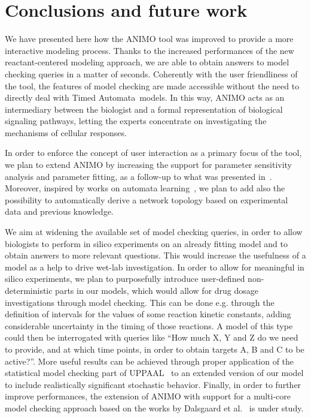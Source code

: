 \documentclass{llncs}
\newcommand{\tas}{Timed Automata}
\begin{document}
\section{Conclusions and future work}\label{sec:conclusion}
We have presented here how the ANIMO tool 
was improved to provide a more interactive modeling process.
Thanks to the increased performances of the new reactant-centered modeling approach,
we are able to obtain answers to model checking queries in a matter of seconds.
Coherently with the user friendliness of the tool, the features
of model checking are made accessible without the need to directly deal with \tas\ models.
In this way, ANIMO acts as an intermediary between the biologist and a formal
representation of biological signaling pathways, letting the experts concentrate
on investigating the mechanisms of cellular responses.

In order to enforce the concept of user interaction as a primary focus of the tool, we plan to extend
ANIMO by increasing the support for parameter sensitivity analysis and parameter fitting,
as a follow-up to what was presented in~\cite{animo-syncop}.
Moreover, inspired by works on automata learning~\cite{test-based-modelling}, we plan to add also the possibility
to automatically derive a network topology based on experimental data and 
previous knowledge.

We aim at widening the available set of model checking queries, in order to allow biologists to perform
in silico experiments on an already fitting model and to obtain answers to more relevant questions.
This would increase the usefulness of a model as a help to drive wet-lab investigation.
In order to allow for meaningful in silico experiments, we plan to purposefully introduce user-defined non-deterministic 
parts in our models, which would allow for drug dosage investigations through model checking.
This can be done e.g. through the definition of intervals for the values of some reaction kinetic constants,
adding considerable uncertainty in the timing of those reactions.
A model of this type could then be interrogated with queries like ``How much X, Y and Z do we need to provide,
and at which time points, in order to obtain targets A, B and C to be active?''.
More useful results can be achieved through proper application of the statistical model checking part of UPPAAL~\cite{uppaal-smc} to
an extended version of our model to include realistically significant stochastic behavior.
Finally, in order to further improve performances, the extension of ANIMO with support for a multi-core model checking approach based on the
works by Dalsgaard et al.~\cite{uppaal-multi-core1}
is under study.





\end{document}
